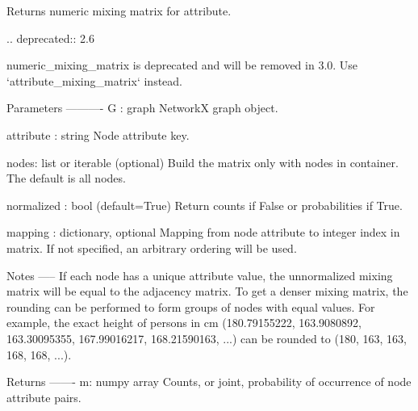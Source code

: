 \begin{DoxyVerb}Returns numeric mixing matrix for attribute.

.. deprecated:: 2.6

   numeric_mixing_matrix is deprecated and will be removed in 3.0.
   Use `attribute_mixing_matrix` instead.

Parameters
----------
G : graph
   NetworkX graph object.

attribute : string
   Node attribute key.

nodes: list or iterable (optional)
    Build the matrix only with nodes in container. The default is all nodes.

normalized : bool (default=True)
   Return counts if False or probabilities if True.

mapping : dictionary, optional
   Mapping from node attribute to integer index in matrix.
   If not specified, an arbitrary ordering will be used.

Notes
-----
If each node has a unique attribute value, the unnormalized mixing matrix
will be equal to the adjacency matrix. To get a denser mixing matrix,
the rounding can be performed to form groups of nodes with equal values.
For example, the exact height of persons in cm (180.79155222, 163.9080892,
163.30095355, 167.99016217, 168.21590163, ...) can be rounded to (180, 163,
163, 168, 168, ...).

Returns
-------
m: numpy array
   Counts, or joint, probability of occurrence of node attribute pairs.
\end{DoxyVerb}
 